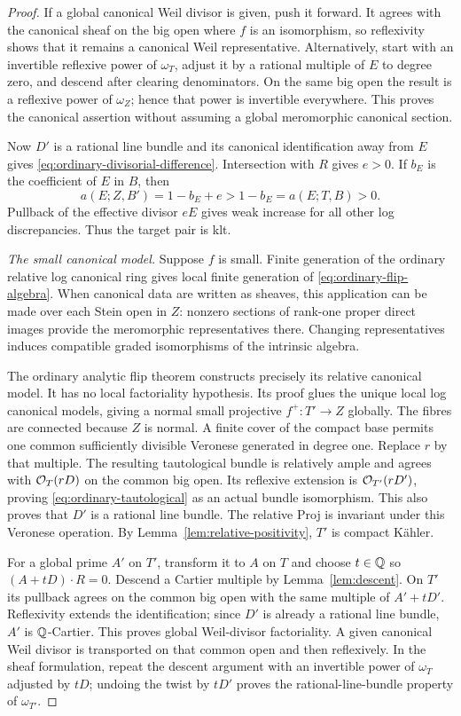 \begin{proof}
If a global canonical Weil divisor is given, push it forward.  It agrees
with the canonical sheaf on the big open where $f$ is an isomorphism, so
reflexivity shows that it remains a canonical Weil representative.
Alternatively, start with an invertible reflexive power of $\omega_T$,
adjust it by a rational multiple of $E$ to degree zero, and descend after
clearing denominators.  On the same big open the result is a reflexive
power of $\omega_Z$; hence that power is invertible everywhere.  This
proves the canonical assertion without assuming a global meromorphic
canonical section.

Now $D'$ is a rational line bundle and its canonical identification away
from $E$ gives \eqref{eq:ordinary-divisorial-difference}.  Intersection
with $R$ gives $e>0$.  If $b_E$ is the coefficient of $E$ in $B$, then
\[
 a(E;Z,B')=1-b_E+e>1-b_E=a(E;T,B)>0.
\]
Pullback of the effective divisor $eE$ gives weak increase for all other
log discrepancies.  Thus the target pair is klt.

\smallskip\noindent
\emph{The small canonical model.}
Suppose $f$ is small.  Finite generation of the ordinary relative log
canonical ring \cite[Theorem~1.18]{Fujino2022} gives local finite
generation of \eqref{eq:ordinary-flip-algebra}.  When canonical data are
written as sheaves, this application can be made over each Stein open
in $Z$: nonzero sections of rank-one proper direct images provide the
meromorphic representatives there.  Changing representatives induces
compatible graded isomorphisms of the intrinsic algebra.

The ordinary analytic flip theorem \cite[Theorem~1.14]{Fujino2022}
constructs precisely its relative canonical model.  It has no local
factoriality hypothesis.  Its proof glues the unique local log canonical
models, giving a normal small projective $f^+:T'\to Z$ globally.  The
fibres are connected because $Z$ is normal.  A finite cover of the
compact base permits one common sufficiently divisible Veronese
generated in degree one.  Replace $r$ by that multiple.  The resulting
tautological bundle is relatively ample and agrees with
$\mathcal O_T(rD)$ on the common big open.  Its reflexive extension is
$\mathcal O_{T'}(rD')$, proving \eqref{eq:ordinary-tautological} as an actual
bundle isomorphism.  This also proves that $D'$ is a rational line
bundle.  The relative Proj is invariant under this Veronese operation.
By Lemma~\ref{lem:relative-positivity}, $T'$ is compact K\"ahler.

For a global prime $A'$ on $T'$, transform it to $A$ on $T$ and choose
$t\in\mathbb Q$ so $(A+tD)\cdot R=0$.  Descend a Cartier multiple by
Lemma~\ref{lem:descent}.  On $T'$ its pullback agrees on the common big
open with the same multiple of $A'+tD'$.  Reflexivity extends the
identification; since $D'$ is already a rational line bundle, $A'$ is
$\mathbb Q$-Cartier.  This proves global Weil-divisor factoriality.  A given
canonical Weil divisor is transported on that common open and then
reflexively.  In the sheaf formulation, repeat the descent argument with
an invertible power of $\omega_T$ adjusted by $tD$; undoing the twist
by $tD'$ proves the rational-line-bundle property of $\omega_{T'}$.


\end{proof}
